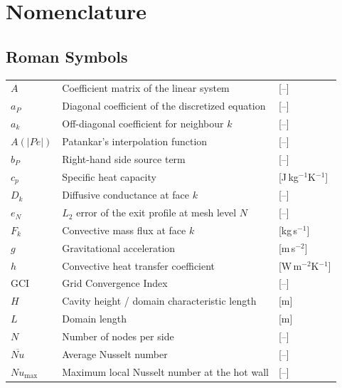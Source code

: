 \section*{Nomenclature}

\subsection*{Roman Symbols}
\begin{tabular}{@{}lll@{}}
    $A$              & Coefficient matrix of the linear system              & [--] \\
    $a_P$            & Diagonal coefficient of the discretized equation     & [--] \\
    $a_k$            & Off-diagonal coefficient for neighbour $k$           & [--] \\
    $A(|Pe|)$        & Patankar's interpolation function                    & [--] \\
    $b_P$            & Right-hand side source term                          & [--] \\
    $c_p$            & Specific heat capacity                               & [J\,kg$^{-1}$K$^{-1}$] \\
    $D_k$            & Diffusive conductance at face $k$                    & [--] \\
    $e_N$            & $L_2$ error of the exit profile at mesh level $N$   & [--] \\
    $F_k$            & Convective mass flux at face $k$                    & [kg\,s$^{-1}$] \\
    $g$              & Gravitational acceleration                           & [m\,s$^{-2}$] \\
    $h$              & Convective heat transfer coefficient                  & [W\,m$^{-2}$K$^{-1}$] \\
    GCI              & Grid Convergence Index                               & [--] \\
    $H$              & Cavity height / domain characteristic length         & [m] \\
    $L$              & Domain length                                        & [m] \\
    $N$              & Number of nodes per side                             & [--] \\
    $\overline{Nu}$  & Average Nusselt number                               & [--] \\
    $Nu_\text{max}$  & Maximum local Nusselt number at the hot wall         & [--] \\

\end{tabular}
